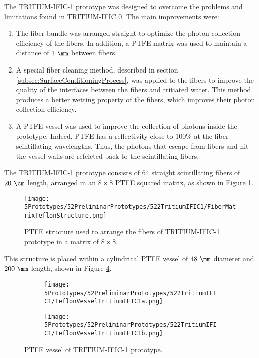 The TRITIUM-IFIC-1 prototype was designed to overcome the problems and limitations found in TRITIUM-IFIC 0. The main improvements were:

\begin{enumerate}

\item{} The fiber bundle was arranged straight to optimize the photon collection efficiency of the fibers. In addition, a PTFE matrix was used to maintain a distance of $1~\mm$ between fibers.

\item{} A special fiber cleaning method, described in section \ref{subsec:SurfaceConditioningProcess}, was applied to the fibers to improve the quality of the interfaces between the fibers and tritiated water. This method produces a better wetting property of the fibers, which improves their photon collection efficiency.

\item{} A PTFE vessel was used to improve the collection of photons inside the prototype. Indeed, PTFE has a reflectivity close to $100\%$ at the fiber scintillating wavelengths. Thus, the photons that escape from fibers and hit the vessel walls are refelcted back to the scintillating fibers.

\end{enumerate}

The TRITIUM-IFIC-1 prototype consists of 64 straight scintillating fibers of $20~\cm$ length, arranged in an $8\times 8$ PTFE squared matrix, as shown in Figure \ref{fig:TeflonStructureFibersTritiumIFIC1}.

\begin{figure}[h]
\centering
\texttt{[image: 5Prototypes/52PreliminarPrototypes/522TritiumIFIC1/FiberMatrixTeflonStructure.png]}
\caption{PTFE structure used to arrange the fibers of TRITIUM-IFIC-1 prototype in a matrix of $8 \times 8$.\label{fig:TeflonStructureFibersTritiumIFIC1}}
\end{figure}
This structure is placed within a cylindrical PTFE vessel of $48~\mm$ diameter and $200~\mm$ length, shown in Figure \ref{fig:TeflonVesselTritumIFIC1}. 

\begin{figure}
\centering
    \begin{subfigure}[b]{0.30\textwidth}
    \centering
    \texttt{[image: 5Prototypes/52PreliminarPrototypes/522TritiumIFIC1/TeflonVesselTritiumIFIC1a.png]}  
    \caption{\label{subfig:TeflonVesselTritumIFIC1a}}
    \end{subfigure}
    \hfill
    \begin{subfigure}[b]{0.45\textwidth}
    \centering
    \texttt{[image: 5Prototypes/52PreliminarPrototypes/522TritiumIFIC1/TeflonVesselTritiumIFIC1b.png]}  
    \caption{\label{subfig:TeflonVesselTritumIFIC1b}}
    \end{subfigure}
 \caption{PTFE vessel of TRITIUM-IFIC-1 prototype.}
 \label{fig:TeflonVesselTritumIFIC1}
\end{figure}

